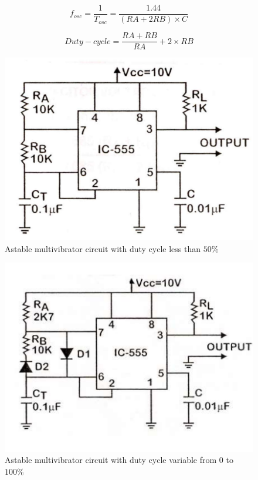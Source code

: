 		\begin{equation}
			f_{osc} = \frac{1}{T_{osc}} = \frac{1.44}{(RA + 2RB)\times C}
			\label{eq:2}
		\end{equation}

		\begin{equation}
			Duty-cycle = \frac{RA+RB}{RA} + 2\times RB
			\label{eq:3}
		\end{equation}

		\begin{figure}[h]
			\centering
			\includegraphics[width=0.8\columnwidth]{images/e5.png}
			\caption{Astable multivibrator circuit with duty cycle less than $50\%$}
			\label{th:4}
		\end{figure}

		\begin{figure}[h]
			\centering
			\includegraphics[width=0.8\columnwidth]{images/e4.png}
			\caption{Astable multivibrator circuit with duty cycle variable from 0 to $100\%$}
			\label{th:5}
		\end{figure}

